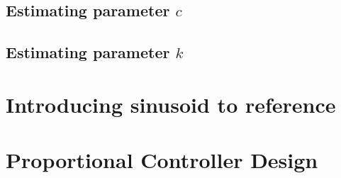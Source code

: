 \documentclass[11pt,titlepage]{article}
\begin{document}
	\subsection{Estimating parameter $c$}

	\subsection{Estimating parameter $k$}

\section{Introducing sinusoid to reference}

\section{Proportional Controller Design}
\end{document}
